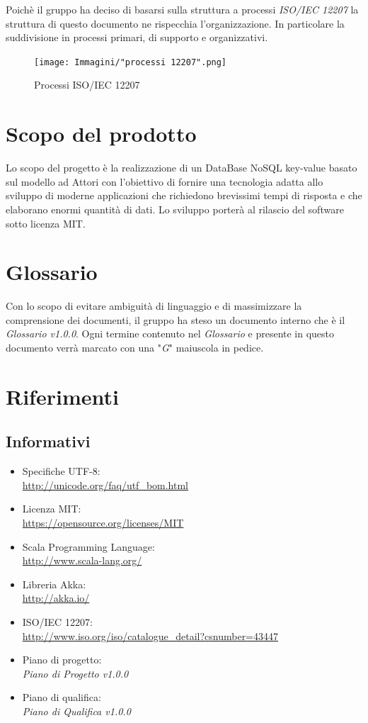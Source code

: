 \documentclass[a4paper]{report}
\begin{document}
	Poichè il gruppo ha deciso di basarsi sulla struttura a processi \emph{ISO/IEC 12207} la struttura di questo documento ne rispecchia 
	l'organizzazione. In particolare la suddivisione in processi primari, di supporto e organizzativi.
	\begin{figure}[h!]
		\centering
		\texttt{[image: Immagini/"processi 12207".png]}
		\caption{Processi ISO/IEC 12207}
	\end{figure}
	\section{Scopo del prodotto}
	Lo scopo del progetto è la realizzazione di un DataBase NoSQL key-value basato sul modello ad Attori con l'obiettivo di fornire una 
	tecnologia adatta allo sviluppo di moderne applicazioni che richiedono brevissimi tempi di risposta e che elaborano enormi quantità 
	di dati. Lo sviluppo porterà al rilascio del software sotto licenza MIT.
	\section{Glossario}
	Con lo scopo di evitare ambiguità di linguaggio e di massimizzare la comprensione dei documenti, il gruppo ha steso un documento 
	interno che è il \emph{Glossario v1.0.0}. Ogni termine contenuto nel \emph{Glossario} e presente in questo documento verrà marcato 
	con una "\textit{G}" maiuscola in pedice.
	\section{Riferimenti}
	\subsection{Informativi}
	\begin{itemize}
		\item Specifiche UTF-8: \\ \url{http://unicode.org/faq/utf_bom.html}
		\item Licenza MIT: \\ \url{https://opensource.org/licenses/MIT}
		\item Scala Programming Language: \\ \url{http://www.scala-lang.org/}
		\item Libreria Akka: \\ \url{http://akka.io/}
		\item ISO/IEC 12207: \\ \url{http://www.iso.org/iso/catalogue_detail?csnumber=43447}
		\item Piano di progetto: \\ \emph{Piano di Progetto v1.0.0}
		\item Piano di qualifica: \\ \emph{Piano di Qualifica v1.0.0}
	\end{itemize}
\end{document}
